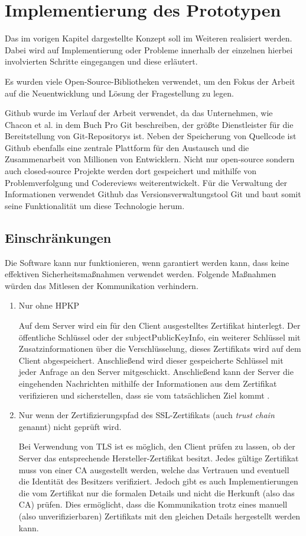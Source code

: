 \chapter{Implementierung des Prototypen}

Das im vorigen Kapitel dargestellte Konzept soll im Weiteren realisiert werden. Dabei wird auf Implementierung oder Probleme innerhalb der einzelnen hierbei involvierten Schritte eingegangen und diese erläutert.

Es wurden viele Open-Source-Bibliotheken verwendet, um den Fokus der Arbeit auf die Neuentwicklung und Lösung der Fragestellung zu legen.

Github wurde im Verlauf der Arbeit verwendet, da das Unternehmen, wie Chacon et al. in dem Buch Pro Git \cite{Chacon2014} beschreiben, der größte Dienstleister für die Bereitstellung von Git-Repositorys ist. Neben der Speicherung von Quellcode ist Github ebenfalls eine zentrale Plattform für den Austausch und die Zusammenarbeit von Millionen von Entwicklern. Nicht nur open-source sondern auch closed-source Projekte werden dort gespeichert und mithilfe von Problemverfolgung und Codereviews weiterentwickelt. Für die Verwaltung der Informationen verwendet Github das Versionsverwaltungstool Git und baut somit seine Funktionalität um diese Technologie herum.

\section{Einschränkungen}
Die Software kann nur funktionieren, wenn garantiert werden kann, dass keine effektiven Sicherheitsmaßnahmen verwendet werden. Folgende Maßnahmen würden das Mitlesen der Kommunikation verhindern.
\begin{enumerate}
    \item Nur ohne \ac{HPKP}
    
    Auf dem Server wird ein für den Client ausgestelltes Zertifikat hinterlegt. Der öffentliche Schlüssel oder der \glqq subjectPublicKeyInfo\grqq{}, ein weiterer Schlüssel mit Zusatzinformationen über die Verschlüsselung, dieses Zertifikats wird auf dem Client abgespeichert. Anschließend wird dieser gespeicherte Schlüssel mit jeder Anfrage an den Server mitgeschickt. Anschließend kann der Server die eingehenden Nachrichten mithilfe der Informationen aus dem Zertifikat verifizieren und sicherstellen, dass sie vom tatsächlichen Ziel kommt \cite{evans_palmer_sleevi_2015}.
    \item Nur wenn der Zertifizierungspfad des SSL-Zertifikats (auch \emph{trust chain} genannt) nicht geprüft wird.
    
    Bei Verwendung von TLS ist es möglich, den Client prüfen zu lassen, ob der Server das entsprechende Hersteller-Zertifikat besitzt. Jedes gültige Zertifikat muss von einer \ac{CA} ausgestellt werden, welche das Vertrauen und eventuell die Identität des Besitzers verifiziert. Jedoch gibt es auch Implementierungen die vom Zertifikat nur die formalen Details und nicht die Herkunft (also das \ac{CA}) prüfen.
    Dies ermöglicht, dass die Kommunikation trotz eines manuell (also unverifizierbaren) Zertifikats mit den gleichen Details hergestellt werden kann.
\end{enumerate}


